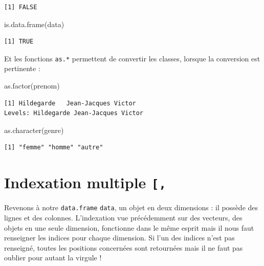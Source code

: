 \documentclass[
  letterpaper,
  DIV=11,
  numbers=noendperiod]{scrreprt}
\newenvironment{Shaded}{\begin{snugshade}}{\end{snugshade}}
\newcommand{\FunctionTok}[1]{\textcolor[rgb]{0.28,0.35,0.67}{#1}}
\newcommand{\NormalTok}[1]{\textcolor[rgb]{0.00,0.23,0.31}{#1}}
\begin{document}
\begin{verbatim}
[1] FALSE
\end{verbatim}

\begin{Shaded}
\begin{Highlighting}[]
\FunctionTok{is.data.frame}\NormalTok{(data)}
\end{Highlighting}
\end{Shaded}

\begin{verbatim}
[1] TRUE
\end{verbatim}

Et les fonctions \texttt{as.*} permettent de convertir les classes,
lorsque la conversion est pertinente :

\begin{Shaded}
\begin{Highlighting}[]
\FunctionTok{as.factor}\NormalTok{(prenom)}
\end{Highlighting}
\end{Shaded}

\begin{verbatim}
[1] Hildegarde   Jean-Jacques Victor      
Levels: Hildegarde Jean-Jacques Victor
\end{verbatim}

\begin{Shaded}
\begin{Highlighting}[]
\FunctionTok{as.character}\NormalTok{(genre)}
\end{Highlighting}
\end{Shaded}

\begin{verbatim}
[1] "femme" "homme" "autre"
\end{verbatim}

\hypertarget{indexation-multiple}{%
\section{\texorpdfstring{Indexation multiple
\texttt{{[},}}{Indexation multiple {[},}}\label{indexation-multiple}}

Revenons à notre \texttt{data.frame} \texttt{data}, un objet en deux
dimensions : il possède des lignes et des colonnes. L'indexation vue
précédemment sur des vecteurs, des objets en une seule dimension,
fonctionne dans le même esprit mais il nous faut renseigner les indices
pour chaque dimension. Si l'un des indices n'est pas renseigné, toutes
les positions concernées sont retournées mais il ne faut pas oublier
pour autant la virgule !
\end{document}
